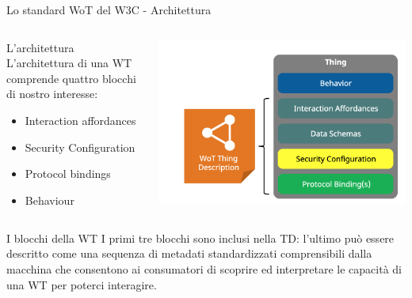 \documentclass{beamer}
\begin{document}
	\begin{frame}{Lo standard WoT del W3C - Architettura}
		\begin{columns}[T]
			\begin{column}{0.5\textwidth}
				\begin{block}{L'architettura}
					L'architettura di una WT comprende quattro blocchi di nostro interesse:
					\begin{itemize}
						\item Interaction affordances
						\item Security Configuration
						\item Protocol bindings
						\item Behaviour
					\end{itemize}
				\end{block}
			\end{column}
			\begin{column}{0.5\textwidth}
				\includegraphics[width=\textwidth]{./images/3.png}
			\end{column}
		\end{columns}
	\begin{block}{I blocchi della WT}
		I primi tre blocchi sono inclusi nella TD: l’ultimo può essere descritto come una sequenza di metadati
		standardizzati comprensibili dalla macchina che consentono ai consumatori di scoprire ed interpretare
		le capacità di una WT per poterci interagire.
	\end{block}
	
	\end{frame}
\end{document}
